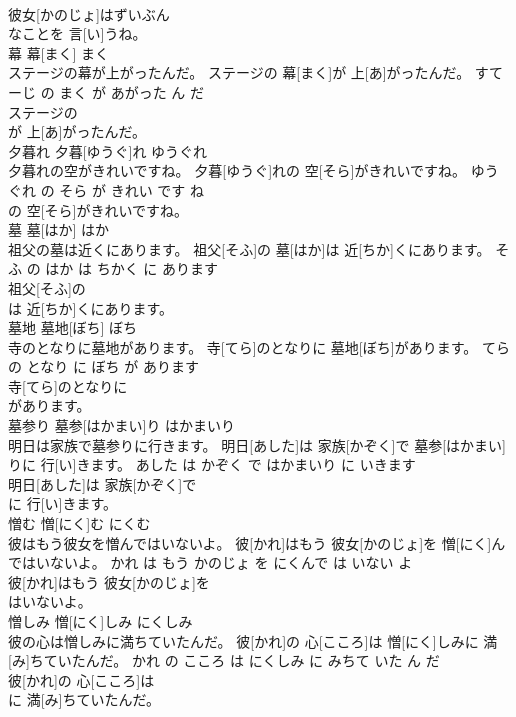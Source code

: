 \documentclass[8pt]{extreport}
\begin{document}
\begin{CJK}{UTF8}{min}
\\	彼女[かのじょ]はずいぶん
\\	なことを 言[い]うね。			
\\	幕	幕[まく]	まく	
\\	ステージの幕が上がったんだ。	ステージの 幕[まく]が 上[あ]がったんだ。	すてーじ の まく が あがった ん だ	
\\	ステージの
\\	が 上[あ]がったんだ。			
\\	夕暮れ	夕暮[ゆうぐ]れ	ゆうぐれ	
\\	夕暮れの空がきれいですね。	夕暮[ゆうぐ]れの 空[そら]がきれいですね。	ゆうぐれ の そら が きれい です ね	
\\	の 空[そら]がきれいですね。			
\\	墓	墓[はか]	はか	
\\	祖父の墓は近くにあります。	祖父[そふ]の 墓[はか]は 近[ちか]くにあります。	そふ の はか は ちかく に あります	
\\	祖父[そふ]の
\\	は 近[ちか]くにあります。			
\\	墓地	墓地[ぼち]	ぼち	
\\	寺のとなりに墓地があります。	寺[てら]のとなりに 墓地[ぼち]があります。	てら の となり に ぼち が あります	
\\	寺[てら]のとなりに
\\	があります。			
\\	墓参り	墓参[はかまい]り	はかまいり	
\\	明日は家族で墓参りに行きます。	明日[あした]は 家族[かぞく]で 墓参[はかまい]りに 行[い]きます。	あした は かぞく で はかまいり に いきます	
\\	明日[あした]は 家族[かぞく]で
\\	に 行[い]きます。			
\\	憎む	憎[にく]む	にくむ	
\\	彼はもう彼女を憎んではいないよ。	彼[かれ]はもう 彼女[かのじょ]を 憎[にく]んではいないよ。	かれ は もう かのじょ を にくんで は いない よ	
\\	彼[かれ]はもう 彼女[かのじょ]を
\\	はいないよ。			
\\	憎しみ	憎[にく]しみ	にくしみ	
\\	彼の心は憎しみに満ちていたんだ。	彼[かれ]の 心[こころ]は 憎[にく]しみに 満[み]ちていたんだ。	かれ の こころ は にくしみ に みちて いた ん だ	
\\	彼[かれ]の 心[こころ]は
\\	に 満[み]ちていたんだ。			

\end{CJK}
\end{document}
